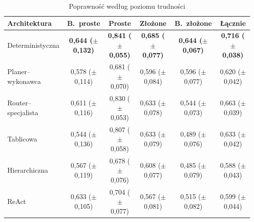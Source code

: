   \begin{table}[H]
    \caption{Poprawność według poziomu trudności}\label{tab:poprawnosc-trudnosc}
    \centering
    \footnotesize
    \renewcommand{\arraystretch}{1.3}
    \begin{tabular}{@{} l c c c c c @{}}
      \toprule
      \textbf{Architektura}
      & \textbf{B.~proste}
      & \textbf{Proste}
      & \textbf{Złożone}
      & \textbf{B.~złożone}
      & \textbf{Łącznie}                                                                                                                                                                  \\
      \midrule
      Deterministyczna    & \textbf{0{,}644 (\(\pm\) 0{,}132)} & \textbf{0{,}841 (\(\pm\) 0{,}055)} & \textbf{0{,}685 (\(\pm\) 0{,}077)} & \textbf{0{,}644 (\(\pm\) 0{,}067)} & \textbf{0{,}716 (\(\pm\) 0{,}038)} \\
      Planer--wykonawca   & 0{,}578 (\(\pm\) 0{,}114)          & 0{,}681 (\(\pm\) 0{,}070)          & 0{,}596 (\(\pm\) 0{,}084)          & 0{,}596 (\(\pm\) 0{,}077)          & 0{,}620 (\(\pm\) 0{,}042)          \\
      Router--specjalista & 0{,}611 (\(\pm\) 0{,}116)          & 0{,}830 (\(\pm\) 0{,}053)          & 0{,}633 (\(\pm\) 0{,}078)          & 0{,}544 (\(\pm\) 0{,}073)          & 0{,}663 (\(\pm\) 0{,}039)          \\
      Tablicowa           & 0{,}544 (\(\pm\) 0{,}136)          & 0{,}807 (\(\pm\) 0{,}058)          & 0{,}633 (\(\pm\) 0{,}079)          & 0{,}489 (\(\pm\) 0{,}076)          & 0{,}633 (\(\pm\) 0{,}042)          \\
      Hierarchiczna       & 0{,}567 (\(\pm\) 0{,}119)          & 0{,}678 (\(\pm\) 0{,}076)          & 0{,}608 (\(\pm\) 0{,}077)          & 0{,}485 (\(\pm\) 0{,}079)          & 0{,}588 (\(\pm\) 0{,}043)          \\
      ReAct               & 0{,}633 (\(\pm\) 0{,}105)          & 0{,}704 (\(\pm\) 0{,}077)          & 0{,}567 (\(\pm\) 0{,}081)          & 0{,}515 (\(\pm\) 0{,}082)          & 0{,}599 (\(\pm\) 0{,}044)          \\
      \bottomrule
    \end{tabular}
  \end{table}

